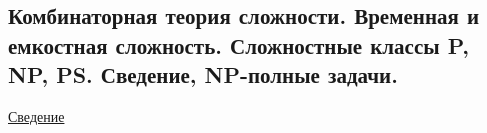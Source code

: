 \subsection{Комбинаторная теория сложности. Временная и емкостная сложность. Сложностные классы P, NP, PS. Сведение, NP-полные задачи.}


\href{https://ru.wikipedia.org/wiki/%D0%A1%D0%B2%D0%B5%D0%B4%D0%B5%D0%BD%D0%B8%D0%B5_(%D1%82%D0%B5%D0%BE%D1%80%D0%B8%D1%8F_%D1%81%D0%BB%D0%BE%D0%B6%D0%BD%D0%BE%D1%81%D1%82%D0%B8_%D0%B2%D1%8B%D1%87%D0%B8%D1%81%D0%BB%D0%B5%D0%BD%D0%B8%D0%B9)}{Сведение}